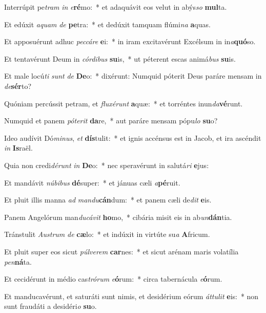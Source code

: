 \item Interrúpit pe\textit{tram} \textit{in} \textit{e}\textbf{ré}mo:~* et adaquávit eos velut in abýs\textit{so} \textbf{mul}ta.
\item Et edúxit \textit{a}\textit{quam} \textit{de} \textbf{pe}tra:~* et dedúxit tamquam flúmi\textit{na} \textbf{a}quas.
\item Et apposuérunt adhuc \textit{pec}\textit{cá}\textit{re} \textbf{e}i:~* in iram excitavérunt Excélsum in in\textit{a}\textbf{quó}so.
\item Et tentavérunt Deum in \textit{cór}\textit{di}\textit{bus} \textbf{su}is,~* ut péterent escas animá\textit{bus} \textbf{su}is.
\item Et male locú\textit{ti} \textit{sunt} \textit{de} \textbf{De}o:~* dixérunt: Numquid póterit Deus paráre mensam in \textit{de}\textbf{sér}to?
\item Quóniam percússit petram, et \textit{flu}\textit{xé}\textit{runt} \textbf{a}quæ:~* et torréntes inun\textit{da}\textbf{vé}runt.
\item Numquid et panem \textit{pót}\textit{e}\textit{rit} \textbf{da}re,~* aut paráre mensam pópu\textit{lo} \textbf{su}o?
\item Ideo audívit Dó\textit{mi}\textit{nus}, \textit{et} \textbf{dís}tulit:~* et ignis accénsus est in Jacob, et ira ascéndit \textit{in} \textbf{Is}raël.
\item Quia non credi\textit{dé}\textit{runt} \textit{in} \textbf{De}o:~* nec speravérunt in salutá\textit{ri} \textbf{e}jus:
\item Et mandávit \textit{nú}\textit{bi}\textit{bus} \textbf{dé}super:~* et jánuas cæli \textit{a}\textbf{pé}ruit.
\item Et pluit illis manna \textit{ad} \textit{man}\textit{du}\textbf{cán}dum:~* et panem cæli de\textit{dit} \textbf{e}is.
\item Panem Angelórum man\textit{du}\textit{cá}\textit{vit} \textbf{ho}mo,~* cibária misit eis in ab\textit{un}\textbf{dán}tia.
\item Tránstulit \textit{Aus}\textit{trum} \textit{de} \textbf{cæ}lo:~* et indúxit in virtúte su\textit{a} \textbf{A}fricum.
\item Et pluit super eos sicut \textit{púl}\textit{ve}\textit{rem} \textbf{car}nes:~* et sicut arénam maris volatília \textit{pen}\textbf{ná}ta.
\item Et cecidérunt in médio cas\textit{tró}\textit{rum} \textit{e}\textbf{ó}rum:~* circa tabernácula \textit{e}\textbf{ó}rum.
\item Et manducavérunt, et saturáti sunt nimis, et desidérium eórum \textit{át}\textit{tu}\textit{lit} \textbf{e}is:~* non sunt fraudáti a desidéri\textit{o} \textbf{su}o.

